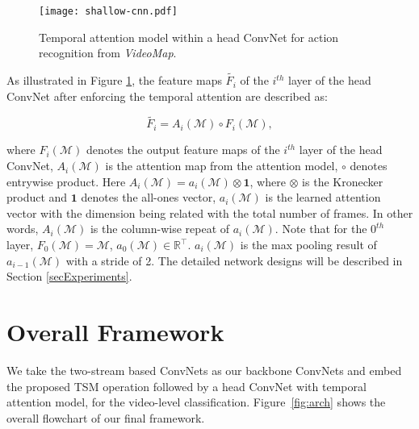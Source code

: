\documentclass[english, 10pt, twocolumn, twoside]{IEEEtran}
\begin{document}
\begin{figure}[t]
\begin{center}
\texttt{[image: shallow-cnn.pdf]}
\end{center}
\vspace{-7mm}
\begin{center}
\caption[width=0.95\linewidth]{Temporal attention model within a head ConvNet for action recognition from \emph{VideoMap}.}
\end{center}
\label{fig:shallow-cnn}
\vspace{-4mm}
\end{figure}



As illustrated in Figure \ref{fig:shallow-cnn}, the feature maps $\tilde{F_{i}}$ of the $i^{th}$ layer of the head ConvNet after enforcing the temporal attention are described as:

\begin{equation}
\tilde{F_{i}} = A_i(\mathcal{M}) \circ F_{i}(\mathcal{M}) , \label{attention}
\end{equation}

\noindent where $F_{i}(\mathcal{M})$ denotes the output feature maps of the $i^{th}$ layer of the head ConvNet, $A_i(\mathcal{M})$ is the attention map from the attention model, $\circ$ denotes entrywise product. Here $A_i(\mathcal{M}) = a_i(\mathcal{M}) \otimes \mathbf{1}$, where $\otimes$ is the Kronecker product and $\mathbf{1}$ denotes the all-ones vector, $a_i(\mathcal{M})$ is the learned attention vector with the dimension being related with the total number of frames. In other words, $A_i(\mathcal{M})$ is the column-wise repeat of $a_i(\mathcal{M})$. Note that for the $0^{th}$ layer, $F_{0}(\mathcal{M}) = \mathcal{M}$, $a_0(\mathcal{M}) \in \mathbb{R}^{\top}$. $a_i(\mathcal{M})$ is the max pooling result of $a_{i-1}(\mathcal{M})$ with a stride of 2. The detailed network designs will be described in Section \ref{secExperiments}.





\section{Overall Framework}



We take the two-stream based ConvNets as our backbone ConvNets and embed the proposed TSM operation followed by a head ConvNet with temporal attention model, for the video-level classification. Figure~\ref{fig:arch} shows the overall flowchart of our final framework.
\end{document}

